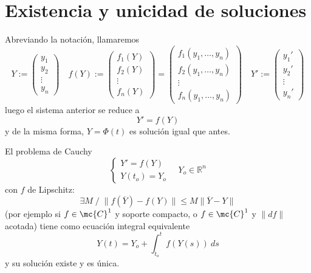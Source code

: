 \section{Existencia y unicidad de soluciones}
Abreviando la notación, llamaremos 
$$Y:=\left( \begin{array}{c}
     y_1  \\
      y_2 \\
      \vdots \\
      y_n
\end{array}\right) \quad f(Y):=\left( \begin{array}{c}
     f_1(Y)  \\
      f_2(Y) \\
      \vdots \\
      f_n(Y) 
\end{array}\right)=\left( \begin{array}{c}
     f_1(y_1, \ldots, y_n)   \\
      f_2(y_1, \ldots, y_n)  \\
      \vdots \\
      f_n(y_1, \ldots, y_n)  
\end{array}\right)\quad Y':=\left( \begin{array}{c}
     y_1'  \\
      y_2' \\
      \vdots \\
      y_n'
\end{array}\right)$$
luego el sistema anterior se reduce a 
$$Y'=f(Y)$$
y de la misma forma, $Y=\Phi(t)$ es solución igual que antes.
\begin{prop}
    El problema de Cauchy
    $$\left\{\begin{array}{l}
         Y'=f(Y)  \\
         Y(t_o)=Y_o
    \end{array} \right. \quad Y_o \in \mathbb R^n$$
    con $f$ de Lipschitz: 
    $$\exists M \; / \; \|f\left(\overline{Y}\right)-f(Y)\|\leq M \|\overline{Y}-Y\|$$
    (por ejemplo si $f \in \mc{C}^1$ y soporte compacto, o $f \in \mc{C}^1$ y $\|df\|$ acotada)
    tiene como ecuación integral equivalente
    $$Y(t)=Y_o+\int_{t_o}^t f(Y(s)) \: ds$$
    y su solución existe y es única.
\end{prop}
